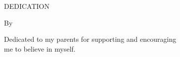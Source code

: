 \chapter*{\normalfont\MakeUppercase\thetitle}

\parbox{\textwidth}{\centering\MakeUppercase{Dedication}

\vspace{15pt}{\noindent\newline A Thesis}

\vspace{8pt}By

\vspace{8pt}{\ifdefined\theStudyType\theFirstStudent\\[8pt]\theSecondStudent\fi}
}

\vspace{5ex}
{\parbox{\textwidth}{\large\centering Dedicated to my parents for supporting and encouraging \\me to believe in myself.}}